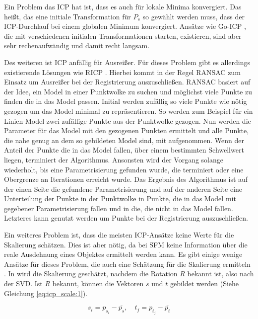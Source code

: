 \documentclass[12pt,titlepage, twoside]{article}
\begin{document}
Ein Problem das ICP hat ist, dass es auch für lokale Minima konvergiert. Das heißt, das eine initiale Transformation für $P_s$ so gewählt werden muss, dass der ICP-Durchlauf bei einem globalen Minimum konvergiert.
Ansätze wie Go-ICP \cite{GoICP}, die mit verschiedenen initialen Transformationen starten, existieren, sind aber sehr rechenaufwändig und damit recht langsam.

Des weiteren ist ICP anfällig für Ausreißer. Für dieses Problem gibt es allerdings existierende Lösungen wie RICP \cite{ICP}. 
Hierbei kommt in der Regel RANSAC \cite{RANSAC} zum Einsatz um Ausreißer bei der Registrierung auszuschließen.
RANSAC basiert auf der Idee, ein Model in einer Punktwolke zu suchen und möglichst viele Punkte zu finden die in das Model passen. 
Initial werden zufällig so viele Punkte wie nötig gezogen um das Model minimal zu repräsentieren. 
So werden zum Beispiel für ein Linien-Model zwei zufällige Punkte aus der Punktwolke gezogen. 
Nun werden die Parameter für das Model mit den gezogenen Punkten ermittelt und alle Punkte, die nahe genug an dem so gebildeten Model sind, mit aufgenommen.
Wenn der Anteil der Punkte die in das Model fallen, über einem bestimmten Schwellwert liegen, terminiert der Algorithmus. 
Ansonsten wird der Vorgang solange wiederholt, bis eine Parametrisierung gefunden wurde, die terminiert oder eine Obergrenze an Iterationen erreicht wurde.
Das Ergebnis des Algorithmus ist auf der einen Seite die gefundene Parametrisierung und auf der anderen Seite eine Unterteilung der Punkte in der Punktwolke in Punkte, 
die in das Model mit gegebener Parametrisierung fallen und in die, die nicht in das Model fallen.
Letzteres kann genutzt werden um Punkte bei der Registrierung auszuschließen.

Ein weiteres Problem ist, dass die meisten ICP-Ansätze keine Werte für die Skalierung schätzen. 
Dies ist aber nötig, da bei SFM keine Information über die reale Ausdehnung eines Objektes ermittelt werden kann.
Es gibt einige wenige Ansätze für dieses Problem, die auch eine Schätzung für die Skalierung ermitteln \cite{Ziner2005PointSR}.
In \cite{Ziner2005PointSR} wird die Skalierung geschätzt, nachdem die Rotation $R$ bekannt ist, also nach der SVD. 
Ist $R$ bekannt, können die Vektoren $s$ und $t$ gebildet werden (Siehe Gleichung \ref{eq:icp_scale:1}).

\begin{equation}
    \label{eq:icp_scale:1}
    s_i = p_{s_i} - \bar{p_s},\quad t_j = p_{t_j} - \bar{p_t}
\end{equation}
\end{document}
